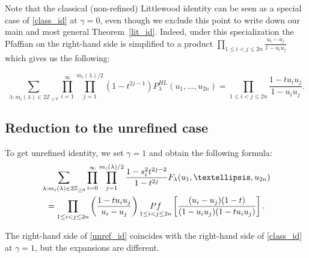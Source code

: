 \documentclass[11pt]{article}
\theoremstyle{definition}
\newcommand{\pf}{\mathop{\rm Pf}}
\begin{document}
Note that the classical (non-refined) Littlewood identity can be seen as a special case of \eqref{class_id} at $\gamma = 0$, even though we exclude this point to write down our main and most general Theorem~\ref{lit_id}. Indeed, under this specialization the Pfaffian on the right-hand side is simplified to a product 
$\prod_{1 \leq i<j \leq 2n} \frac{ u_i - u_j}
{1-u_i u_j}$ which gives us the following:

\begin{equation*}
\sum_{\lambda: m_{i}(\lambda) \in 2 \mathbb{Z}_{\geq 0}}  \prod_{i = 1}^{\infty} \prod_{j = 1}^{m_{i}(\lambda) / 2} (1 - t^{2j-1}) P_{\lambda}^{HL} (u_1,\ldots,u_{2n})
=
\prod_{1 \leq i<j \leq 2n}
\frac{1-t u_i u_j}{1 - u_i u_j} .
\end{equation*}

\subsection{Reduction to the unrefined case}
To get unrefined identity, we set $\gamma = 1$ and obtain the following formula:
\begin{multline} \label{unref_id}
\sum_{\lambda: m_{i}(\lambda) \in 2 \mathbb{Z}_{\geq 0}}   \prod_{i = 0}^{\infty} \prod_{j = 1}^{m_{i}(\lambda) / 2} \frac{1 - s_{i}^2 t^{2j - 2}}{1 - t^{2j}} F_{\lambda} (u_1, \dots, u_{2n})
\\
=
\prod_{1 \leq i<j \leq 2n}
\left(
\frac{1-t u_i u_j}{u_i - u_j}
\right) 
\pf_{1\leq i < j \leq 2n}
\left[
\frac{ (u_i - u_j)(1 - t) }
{(1-u_i u_j) (1-t u_i u_j)}
\right].
\end{multline}

The right-hand side of \eqref{unref_id} coincides with the right-hand side of \eqref{class_id} at $\gamma = 1$, but the expansions are different.
\end{document}
